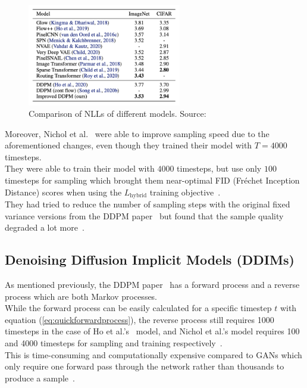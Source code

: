 \documentclass{article}
\numberwithin{equation}{section}
\numberwithin{figure}{section}
\begin{document}
\begin{figure}[h]
  \begin{center}
    \includegraphics[width= 0.6\textwidth]{images/comparison.png}
    \caption{Comparison of NLLs of different models. Source:~\cite{nichol2021improved}}
  \end{center}
\end{figure}

Moreover, Nichol et al.~\cite{nichol2021improved} were able to improve sampling speed due to the aforementioned changes, even though they trained their model with $T = 4000$ timesteps. \\
They were able to train their model with $4000$ timesteps, but use only $100$ timesteps for sampling which brought them near-optimal FID (Fréchet Inception Distance) scores when using the $L_{\text{hybrid}}$ training objective~\cite{nichol2021improved}. \\
They had tried to reduce the number of sampling steps with the original fixed variance versions from the DDPM paper~\cite{ho2020denoising} but found that the sample quality degraded a lot more~\cite{nichol2021improved}.

\newpage

\subsection{Denoising Diffusion Implicit Models (DDIMs)}
As mentioned previously, the DDPM paper~\cite{ho2020denoising} has a forward process and a reverse process which are both Markov processes. \\
While the forward process can be easily calculated for a specific timestep $t$ with equation (\ref{eq:quickforwardprocess}), the reverse process still requires 1000 timesteps in the case of Ho et al.'s~\cite{ho2020denoising} model, and Nichol et al.'s model requires 100 and 4000 timesteps for sampling and training respectively~\cite{nichol2021improved}. \\
This is time-consuming and computationally expensive compared to GANs which only require one forward pass through the network rather than thousands to produce a sample~\cite{song2022denoising}.
\end{document}
